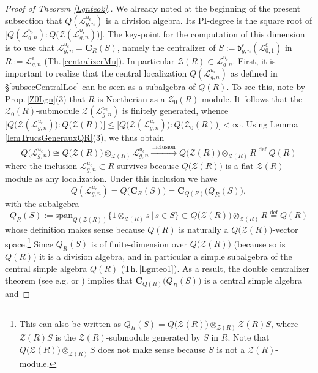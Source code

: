 \documentclass[11pt]{amsart}
\newcommand{\e}{\epsilon}
\newcommand{\Ll}{\mathcal{L}}
\begin{document}
\begin{proof}[Proof of Theorem \ref{Lgnteo2}.]
We already noted at the beginning of the present subsection that $Q(\Ll_{g,n}^{u_\e})$ is a division algebra. Its PI-degree is the square root of $\bigl[ Q(\Ll_{g,n}^{u_\e}) : Q\bigl( \mathcal{Z}(\Ll_{g,n}^{u_\e}) \bigr) \bigr]$. The key-point for the computation of this dimension is to use that $\mathcal{L}_{g,n}^{u_\e}=\mathbf{C}_R(S)$, namely the centralizer of $S := \mathfrak{d}_{g,n}^{\e}(\mathcal{L}_{0,1}^\e)$ in $R := \mathcal{L}_{g,n}^{\e}$ (Th.\,\ref{centralizerMu}). In particular $\mathcal{Z}(R) \subset \Ll_{g,n}^{u_\e}$. First, it is important to realize that the central localization $Q(\mathcal{L}_{g,n}^{u_\e})$ as defined in \S\ref{subsecCentralLoc} can be seen as a subalgebra of $Q(R)$. To see this, note by Prop.\,\ref{Z0Lgn}(3) that $R$ is Noetherian as a $\mathcal{Z}_0(R)$-module. It follows that the $\mathcal{Z}_0(R)$-submodule $\mathcal{Z}(\mathcal{L}_{g,n}^{u_\e})$ is finitely generated, whence $\bigl[ Q\bigl( \mathcal{Z}(\mathcal{L}_{g,n}^{u_\e}) \bigr) : Q\bigl( \mathcal{Z}(R) \bigr) \bigr] \leq \bigl[ Q\bigl( \mathcal{Z}(\mathcal{L}_{g,n}^{u_\e}) \bigr) : Q\bigl( \mathcal{Z}_0(R) \bigr) \bigr] < \infty$. Using Lemma \ref{lemTrucsGenerauxQR}(3), we thus obtain
\[ Q\bigl( \mathcal{L}_{g,n}^{u_\e} \bigr) \cong Q\bigl( \mathcal{Z}(R) \bigr) \otimes_{\mathcal{Z}(R)} \mathcal{L}_{g,n}^{u_\e} \xrightarrow{\:\text{inclusion}\:} Q\bigl( \mathcal{Z}(R) \bigr) \otimes_{\mathcal{Z}(R)} R \overset{\text{def}}{=} Q(R) \]
where the inclusion $\mathcal{L}_{g,n}^{u_\e} \subset R$ survives because $Q\bigl( \mathcal{Z}(R) \bigr)$ is a flat $\mathcal{Z}(R)$-module as any localization. Under this inclusion we have
\begin{equation}\label{InvAsCentralizer}
Q(\mathcal{L}_{g,n}^{u_\e}) = Q\bigl( \mathbf{C}_R(S) \bigr) = \mathbf{C}_{Q(R)}\bigl( Q_R(S) \bigr),
\end{equation}
with the subalgebra
\begin{equation}\label{centralizersept25}
Q_R(S) := \mathrm{span}_{Q(\mathcal{Z}(R))}\bigl\{ 1 \otimes_{\mathcal{Z}(R)} s \, | \, s \in S \bigr\} \subset Q\bigl( \mathcal{Z}(R) \bigr) \otimes_{\mathcal{Z}(R)} R \overset{\text{def}}{=} Q(R)
\end{equation}
whose definition makes sense because $Q(R)$ is naturally a $Q\bigl( \mathcal{Z}(R) \bigr)$-vector space.\footnote{This can also be written as $Q_R(S) = Q\bigl( \mathcal{Z}(R) \bigr) \otimes_{\mathcal{Z}(R)} \mathcal{Z}(R)S$, where $\mathcal{Z}(R)S$ is the $\mathcal{Z}(R)$-submodule generated by $S$ in $R$. Note that $Q\bigl( \mathcal{Z}(R) \bigr) \otimes_{\mathcal{Z}(R)} S$ does not make sense because $S$ is not a $\mathcal{Z}(R)$-module.} Since $Q_R(S)$ is of finite-dimension over $Q\bigl( \mathcal{Z}(R) \bigr)$ (because so is $Q(R)$) it is a division algebra, and in particular a simple subalgebra of the central simple algebra $Q(R)$ (Th.\,\ref{Lgnteo1}). As a result, the double centralizer theorem (see e.g. \cite[Th.\,7.1.9]{Rowen} or \cite[Th.\,7.1]{StackP2}) implies that $\mathbf{C}_{Q(R)}\bigl( Q_R(S) \bigr)$ is a central simple algebra and 

\end{proof}
\end{document}
